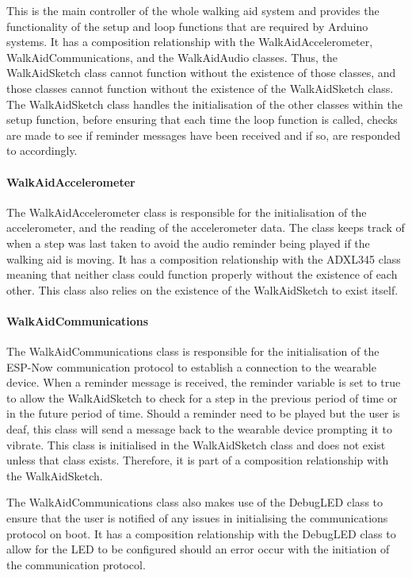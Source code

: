                     This is the main controller of the whole walking aid system and provides the functionality of the setup and loop functions that are required by Arduino systems. It has a composition relationship with the WalkAidAccelerometer, WalkAidCommunications, and the WalkAidAudio classes. Thus, the WalkAidSketch class cannot function without the existence of those classes, and those classes cannot function without the existence of the WalkAidSketch class. The WalkAidSketch class handles the initialisation of the other classes within the setup function, before ensuring that each time the loop function is called, checks are made to see if reminder messages have been received and if so, are responded to accordingly.

                \paragraph{WalkAidAccelerometer}\mbox{}

                    The WalkAidAccelerometer class is responsible for the initialisation of the accelerometer, and the reading of the accelerometer data. The class keeps track of when a step was last taken to avoid the audio reminder being played if the walking aid is moving. It has a composition relationship with the ADXL345 class meaning that neither class could function properly without the existence of each other. This class also relies on the existence of the WalkAidSketch to exist itself.

                \paragraph{WalkAidCommunications}\mbox{}

                    The WalkAidCommunications class is responsible for the initialisation of the ESP-Now communication protocol to establish a connection to the wearable device. When a reminder message is received, the reminder variable is set to true to allow the WalkAidSketch to check for a step in the previous period of time or in the future period of time. Should a reminder need to be played but the user is deaf, this class will send a message back to the wearable device prompting it to vibrate. This class is initialised in the WalkAidSketch class and does not exist unless that class exists. Therefore, it is part of a composition relationship with the WalkAidSketch.

                    The WalkAidCommunications class also makes use of the DebugLED class to ensure that the user is notified of any issues in initialising the communications protocol on boot. It has a composition relationship with the DebugLED class to allow for the LED to be configured should an error occur with the initiation of the communication protocol.

